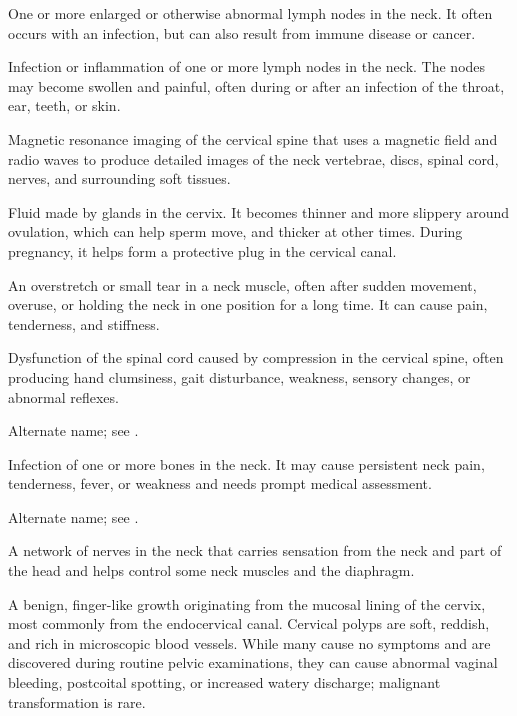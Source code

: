  One or more enlarged or otherwise abnormal lymph nodes in the neck. It often occurs with an infection, but can also result from immune disease or cancer.

 Infection or inflammation of one or more lymph nodes in the neck. The nodes may become swollen and painful, often during or after an infection of the throat, ear, teeth, or skin.

 Magnetic resonance imaging of the cervical spine that uses a magnetic field and radio waves to produce detailed images of the neck vertebrae, discs, spinal cord, nerves, and surrounding soft tissues.

 Fluid made by glands in the cervix. It becomes thinner and more slippery around ovulation, which can help sperm move, and thicker at other times. During pregnancy, it helps form a protective plug in the cervical canal.

 An overstretch or small tear in a neck muscle, often after sudden movement, overuse, or holding the neck in one position for a long time. It can cause pain, tenderness, and stiffness.

 Dysfunction of the spinal cord caused by compression in the cervical spine, often producing hand clumsiness, gait disturbance, weakness, sensory changes, or abnormal reflexes.

 Alternate name; see .

 Infection of one or more bones in the neck. It may cause persistent neck pain, tenderness, fever, or weakness and needs prompt medical assessment.

 Alternate name; see .

 A network of nerves in the neck that carries sensation from the neck and part of the head and helps control some neck muscles and the diaphragm.

 A benign, finger-like growth originating from the mucosal lining of the cervix, most commonly from the endocervical canal. Cervical polyps are soft, reddish, and rich in microscopic blood vessels. While many cause no symptoms and are discovered during routine pelvic examinations, they can cause abnormal vaginal bleeding, postcoital spotting, or increased watery discharge; malignant transformation is rare.

